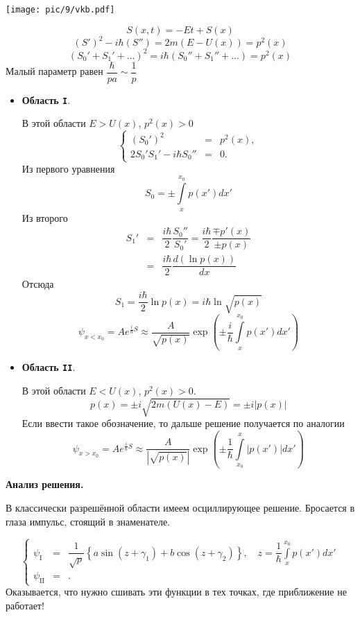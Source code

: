 \centerline{\texttt{[image: pic/9/vkb.pdf]}}
$$
    S(x, t) = -Et + S(x)
$$
$$
    (S')^2 - i\hbar (S'') = 2m(E - U(x)) = p^2(x)
$$
$$
    (S_0' + S_1' + \ldots)^2 = i\hbar (S_0'' + S_1'' + \ldots) = p^2(x)
$$
Малый параметр равен $\dfrac{\hbar}{p a} \sim \dfrac{1}{p}$
\begin{itemize}
  \item \textbf{Область \texttt{I}}.
  
  В этой области $E > U(x)$, $p^2(x) > 0$
  $$
    \left\{
      \begin{array}{lcl}
        (S_0')^2 & = & p^2(x) ,\\
        2S_0'S_1' - i\hbar S_0'' & = & 0 .
      \end{array}
    \right.
  $$
  Из первого уравнения
  $$
      S_0  =  \pm \int\limits_{x}^{x_0} p(x') dx'
  $$
  Из второго
  \begin{eqnarray*}
    S_1' &=& \dfrac{i\hbar}{2} \dfrac{S_0''}{S_0'} = \dfrac{i\hbar}{2} \dfrac{\mp p'(x)}{\pm p(x)}\\
    &=& \dfrac{i\hbar}{2} \dfrac{d (\ln p(x))}{dx}
  \end{eqnarray*}
  Отсюда
  $$
    S_1 = \dfrac{i\hbar}{2} \ln p(x) = i \hbar \ln \sqrt{p(x)}
  $$
  $$
    \psi_{x < x_0} = A e^{\frac{i}{\hbar} S} \approx \dfrac{A}{\sqrt{p(x)}} \exp\left(
        \pm \dfrac{i}{\hbar} \int\limits_{x}^{x_0} p(x') dx'
    \right)
  $$
  \item \textbf{Область \texttt{II}}.
  
  В этой области $E < U(x)$, $p^2(x) > 0$.
  $$
    p(x) = \pm i \sqrt{ 2m(U(x) - E)} = \pm i |p(x)|
  $$
  Если ввести такое обозначение, то дальше решение получается по аналогии
  $$
    \psi_{x > x_0} = A e^{\frac{i}{\hbar} S} \approx \dfrac{A}{|\sqrt{p(x)}|} \exp\left(
        \pm \dfrac{1}{\hbar} \int\limits_{x_0}^{x} |p(x')| dx'
    \right)
  $$
\end{itemize}

\textbf{Анализ решения.}

В классически разрешённой области имеем осциллирующее решение. Бросается в глаза импульс, стоящий в знаменателе.

$$
    \left\{
      \begin{array}{lcl}
        \psi_{\mathrm{I}} & = & \dfrac{1}{\sqrt{p}} \left\{
            a \sin (z + \gamma_1) + b \cos (z + \gamma_2)
        \right\} , \quad z = \dfrac{1}{\hbar}\int\limits_{x}^{x_0} p(x') dx'\\
        \psi_{\mathrm{II}} & = & .
      \end{array}
    \right.
$$
Оказывается, что нужно сшивать эти функции в тех точках, где приближение не работает!